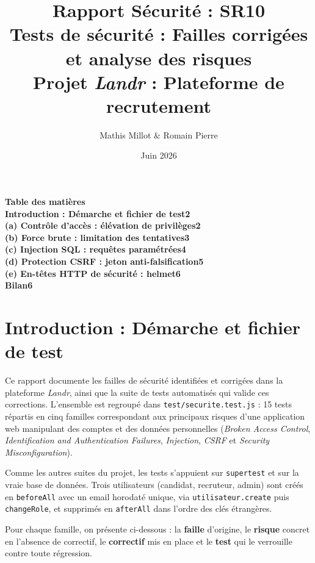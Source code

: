 \documentclass[12pt,a4paper]{article}
\title{\textbf{Rapport Sécurité : SR10}\\
\large Tests de sécurité : Failles corrigées et analyse des risques\\[4pt]
\normalsize Projet \textit{Landr} : Plateforme de recrutement}
\author{Mathis Millot \& Romain Pierre}
\date{Juin 2026}
\begin{document}
\maketitle
\thispagestyle{empty}

{\large\bfseries Table des matières}\\[1em]
\noindent\textbf{Introduction : Démarche et fichier de test}\dotfill\textbf{2}\\[6pt]
\noindent\textbf{(a) Contrôle d'accès : élévation de privilèges}\dotfill\textbf{2}\\[2pt]
\noindent\textbf{(b) Force brute : limitation des tentatives}\dotfill\textbf{3}\\[2pt]
\noindent\textbf{(c) Injection SQL : requêtes paramétrées}\dotfill\textbf{4}\\[2pt]
\noindent\textbf{(d) Protection CSRF : jeton anti-falsification}\dotfill\textbf{5}\\[2pt]
\noindent\textbf{(e) En-têtes HTTP de sécurité : helmet}\dotfill\textbf{6}\\[6pt]
\noindent\textbf{Bilan}\dotfill\textbf{6}
\newpage

\section{Introduction : Démarche et fichier de test}

Ce rapport documente les failles de sécurité identifiées et corrigées dans la plateforme \textit{Landr}, ainsi que la suite de tests automatisés qui valide ces corrections. L'ensemble est regroupé dans \texttt{test/securite.test.js} : 15 tests répartis en cinq familles correspondant aux principaux risques d'une application web manipulant des comptes et des données personnelles (\textit{Broken Access Control}, \textit{Identification and Authentication Failures}, \textit{Injection}, \textit{CSRF} et \textit{Security Misconfiguration}).

Comme les autres suites du projet, les tests s'appuient sur \texttt{supertest} et sur la vraie base de données. Trois utilisateurs (candidat, recruteur, admin) sont créés en \texttt{beforeAll} avec un email horodaté unique, via \texttt{utilisateur.create} puis \texttt{changeRole}, et supprimés en \texttt{afterAll} dans l'ordre des clés étrangères.

Pour chaque famille, on présente ci-dessous : la \textbf{faille} d'origine, le \textbf{risque} concret en l'absence de correctif, le \textbf{correctif} mis en place et le \textbf{test} qui le verrouille contre toute régression.
\end{document}
